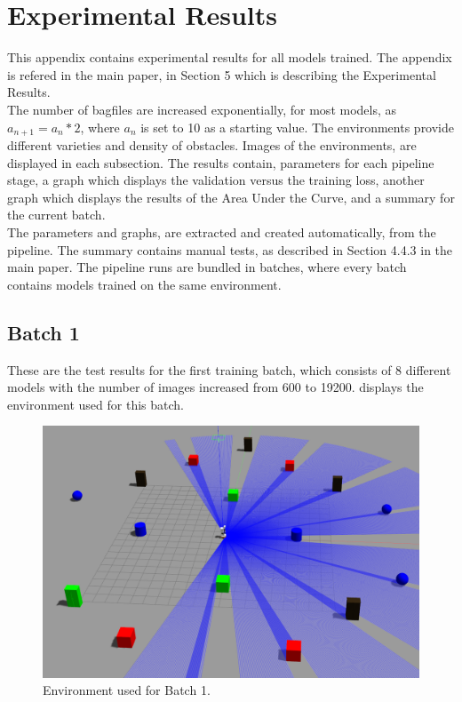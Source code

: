\section{Experimental Results \label{ExperimentalResults} }
This appendix contains experimental results for all models trained. The appendix is refered in the main paper, in Section 5 which is describing the Experimental Results.\\

The number of bagfiles are increased exponentially, for most models, as $a_{n+1} = a_{n} * 2$, where $a_{n}$ is set to 10 as a starting value. The environments provide different varieties and density of obstacles. Images of the environments, are displayed in each subsection. The results contain, parameters for each pipeline stage, a graph which displays the validation versus the training loss, another graph which displays the results of the Area Under the Curve, and a summary for the current batch.\\ 

The parameters and graphs, are extracted and created automatically, from the pipeline. The summary contains manual tests, as described in Section 4.4.3 in the main paper. The pipeline runs are bundled in batches, where every batch contains models trained on the same environment.
\newpage

\subsection{Batch 1 \label{batch_1} }
These are the test results for the first training batch, which consists of 8 different models with the number of images increased from 600 to 19200.  displays the environment used for this batch.

\begin{figure}[H]%
\centering
\includegraphics[width=1\textwidth]{Bilder/env3.png} 
\caption[]{Environment used for Batch 1.}
\label{env3}
\end{figure}

